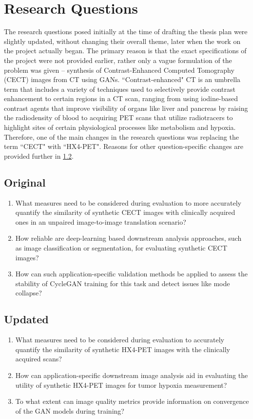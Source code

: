 \section{Research Questions}
The research questions posed initially at the time of drafting the thesis plan were slightly updated, without changing their overall theme, later when the work on the project actually began. The primary reason is that the exact specifications of the project were not provided earlier, rather only a vague formulation of the problem was given -- synthesis of Contrast-Enhanced Computed Tomography (CECT) images from CT using GANs. ``Contrast-enhanced" CT is an umbrella term that includes a variety of techniques used to selectively provide contrast enhancement to certain regions in a CT scan, ranging from using iodine-based contrast agents that improve visibility of organs like liver and pancreas by raising the radiodensity of blood to acquiring PET scans that utilize radiotracers to highlight sites of certain physiological processes like metabolism and hypoxia. Therefore, one of the main changes in the research questions was replacing the term ``CECT" with ``HX4-PET". Reasons for other question-specific changes are provided further in \ref{updated_research_questions}.


\subsection{Original}
\begin{enumerate}
    \item What measures need to be considered during evaluation to more accurately quantify the similarity of synthetic CECT images with clinically acquired ones in an unpaired image-to-image translation scenario?
    \item How reliable are deep-learning based downstream analysis approaches, such as image classification or segmentation, for evaluating synthetic CECT images?
    \item How can such application-specific validation methods be applied to assess the stability of CycleGAN training for this task and detect issues like mode collapse?
\end{enumerate}


\subsection{Updated}
\label{updated_research_questions}

\begin{enumerate}
    \item What measures need to be considered during evaluation to accurately quantify the similarity of synthetic HX4-PET images with the clinically acquired scans?
    \item How can application-specific downstream image analysis aid in evaluating the utility of synthetic HX4-PET images for tumor hypoxia measurement?
    \item To what extent can image quality metrics provide information on convergence of the GAN models during training?
\end{enumerate}


